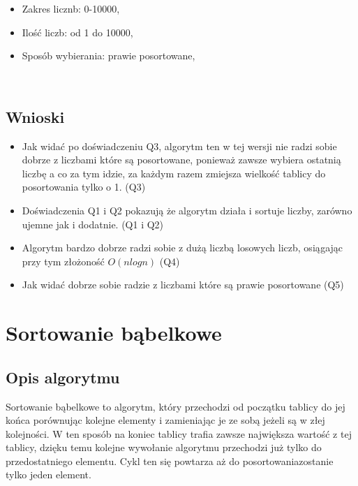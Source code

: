 \documentclass[11pt]{article}
\providecommand{\tightlist}{%
      \setlength{\itemsep}{0pt}\setlength{\parskip}{0pt}}
\begin{document}
\begin{itemize}
\tightlist
\item
  Zakres licznb: 0-10000,
\item
  Ilość liczb: od 1 do 10000,
\item
  Sposób wybierania: prawie posortowane,
\end{itemize}
    \begin{center}
    \end{center}
    { \hspace*{\fill} \\}
    
    \hypertarget{wnioski}{%
\subsection{Wnioski}\label{wnioski}}

\begin{itemize}
\tightlist
\item
  Jak widać po doświadczeniu Q3, algorytm ten w tej wersji nie radzi
  sobie dobrze z liczbami które są posortowane, ponieważ zawsze wybiera
  ostatnią liczbę a co za tym idzie, za każdym razem zmiejsza wielkość
  tablicy do posortowania tylko o 1. (Q3)
\item
  Doświadczenia Q1 i Q2 pokazują że algorytm działa i sortuje liczby,
  zarówno ujemne jak i dodatnie. (Q1 i Q2)
\item
  Algorytm bardzo dobrze radzi sobie z dużą liczbą losowych liczb,
  osiągając przy tym złożoność $ O(nlogn) $ (Q4)
\item
  Jak widać dobrze sobie radzie z liczbami które są prawie posortowane
  (Q5)
\end{itemize}

    \hypertarget{sortowanie-bux105belkowe}{%
\section{Sortowanie bąbelkowe}\label{sortowanie-bux105belkowe}}

\hypertarget{opis-algorytmu}{%
\subsection{Opis algorytmu}\label{opis-algorytmu}}

Sortowanie bąbelkowe to algorytm, który przechodzi od początku tablicy
do jej końca porównując kolejne elementy i zamieniając je ze sobą jeżeli
są w złej kolejności. W ten sposób na koniec tablicy trafia zawsze
największa wartość z tej tablicy, dzięku temu kolejne wywołanie
algorytmu przechodzi już tylko do przedostatniego elementu. Cykl ten się
powtarza aż do posortowaniazostanie tylko jeden element.
\end{document}
